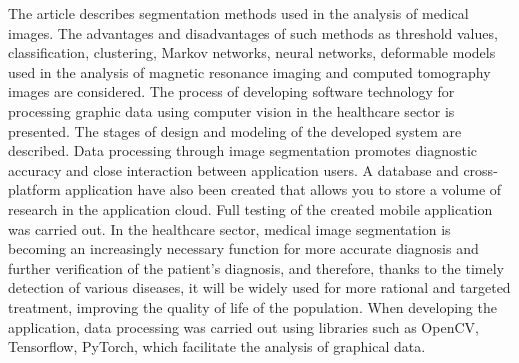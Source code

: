 The article describes segmentation methods used in the analysis of
medical images. The advantages and disadvantages of such methods as
threshold values, classification, clustering, Markov networks, neural
networks, deformable models used in the analysis of magnetic resonance
imaging and computed tomography images are considered. The process of
developing software technology for processing graphic data using
computer vision in the healthcare sector is presented. The stages of
design and modeling of the developed system are described. Data
processing through image segmentation promotes diagnostic accuracy and
close interaction between application users. A database and
cross-platform application have also been created that allows you to
store a volume of research in the application cloud. Full testing of the
created mobile application was carried out. In the healthcare sector,
medical image segmentation is becoming an increasingly necessary
function for more accurate diagnosis and further verification of the
patient's diagnosis, and therefore, thanks to the timely detection of
various diseases, it will be widely used for more rational and targeted
treatment, improving the quality of life of the population. When
developing the application, data processing was carried out using
libraries such as OpenCV, Tensorflow, PyTorch, which facilitate the
analysis of graphical data.

